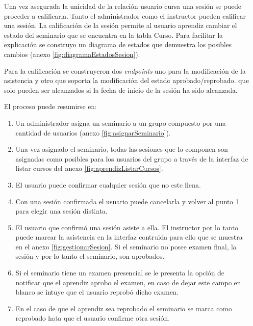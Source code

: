 Una vez asegurada la unicidad de la relación usuario cursa una sesión se puede proceder a calificarla. Tanto el administrador como el instructor pueden calificar una sesión. La calificación de la sesión permite al usuario aprendiz cambiar el estado del seminario que se encuentra en la tabla Curso. Para facilitar la explicación se construyo un diagrama de estados que demuestra los posibles cambios (anexo \ref{fig:diagramaEstadosSesion}). 

Para la calificación se construyeron dos \emph{endpoints} uno para la modificación de la asistencia y otro que soporta la modificación del estado aprobado/reprobado. que solo pueden ser alcanzados si la fecha de inicio de la sesión ha sido alcanzada.

El proceso puede resumirse en:

\begin{enumerate}
	\item Un administrador asigna un seminario a un grupo compuesto por una cantidad de usuarios (anexo \ref{fig:asignarSeminario}). 
	
	\item Una vez asignado el seminario, todas las sesiones que lo componen son asignadas como posibles para los usuarios del grupo a través de la interfaz de listar cursos del anexo \ref{fig:aprendizListarCursos}.

	\item El usuario puede confirmar cualquier sesión que no este llena.

	\item Con una sesión confirmada el usuario puede cancelarla y volver al punto 1 para elegir una sesión distinta.

	\item El usuario que confirmó una sesión asiste a ella. El instructor por lo tanto puede marcar la asistencia en la interfaz contruida para ello que se muestra en el anexo \ref{fig:gestionarSesion}. Si el seminario no posee examen final, la sesión y por lo tanto el seminario, son aprobados.

	\item Si el seminario tiene un examen presencial se le presenta la opción de notificar que el aprendiz aprobo el examen, en caso de dejar este campo en blanco se intuye que el usuario reprobó dicho examen.

	\item En el caso de que el aprendiz sea reprobado el seminario se marca como reprobado hata que el usuario confirme otra sesión.

\end{enumerate}

